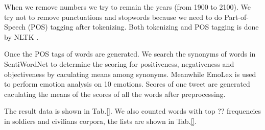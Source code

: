 When we remove numbers we try to remain the years (from 1900 to 2100).
We try not to remove punctuations and stopwords because we need to do Part-of-Speech (POS) tagging after tokenizing. Both tokenizing and POS tagging is done by NLTK \citep{NLTK}.

Once the POS tags of words are generated. We search the synonyms of words in SentiWordNet to determine the scoring for positiveness, negativeness and objectiveness by caculating means among synonyms. Meanwhile EmoLex is used to perform emotion analysis on 10 emotions. Scores of one tweet are generated caculating the means of the scores of all the words after preprocessing.

The result data is shown in Tab.\ref{}. We also counted words with top ?? frequencies in soldiers and civilians corpora, the lists are shown in Tab.\ref{}.
